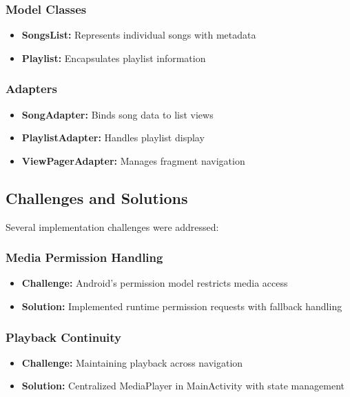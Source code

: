 \documentclass{article}
\begin{document}
\subsubsection{Model Classes}
\begin{itemize}
    \item \textbf{SongsList:} Represents individual songs with metadata
    \item \textbf{Playlist:} Encapsulates playlist information
\end{itemize}

\subsubsection{Adapters}
\begin{itemize}
    \item \textbf{SongAdapter:} Binds song data to list views
    \item \textbf{PlaylistAdapter:} Handles playlist display
    \item \textbf{ViewPagerAdapter:} Manages fragment navigation
\end{itemize}

\subsection{Challenges and Solutions}
Several implementation challenges were addressed:

\subsubsection{Media Permission Handling}
\begin{itemize}
    \item \textbf{Challenge:} Android's permission model restricts media access
    \item \textbf{Solution:} Implemented runtime permission requests with fallback handling
\end{itemize}

\subsubsection{Playback Continuity}
\begin{itemize}
    \item \textbf{Challenge:} Maintaining playback across navigation
    \item \textbf{Solution:} Centralized MediaPlayer in MainActivity with state management
\end{itemize}
\end{document}

